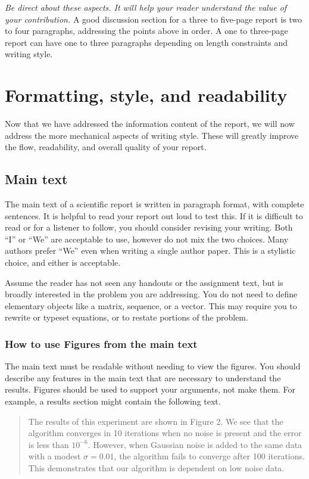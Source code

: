 \documentclass[]{article}
\begin{document}
\emph{Be direct about these aspects. It will help your reader understand the value of your contribution.}
A good discussion section for a three to five-page report is two to four paragraphs, addressing the points above in order. A one to three-page report can have one to three paragraphs depending on length constraints and writing style.

\section{Formatting, style, and readability}

Now that we have addressed the information content of the report, we will now address the more mechanical aspects of writing style. These will greatly improve the flow, readability, and overall quality of your report.

\subsection{Main text}
The main text of a scientific report is written in paragraph format, with complete sentences. It is helpful to read your report out loud to test this. If it is difficult to read or for a listener to follow, you should consider revising your writing. Both ``I'' or ``We'' are acceptable to use, however do not mix the two choices. Many authors prefer ``We'' even when writing a single author paper. This is a stylistic choice, and either is acceptable.


Assume the reader has not seen any handouts or the assignment text, but is broadly interested in the problem you are addressing. You do not need to define elementary objects like a matrix, sequence, or a vector.
This may require you to rewrite or typeset equations, or to restate portions of the problem.

\subsubsection{How to use Figures from the main text}
The main text must be readable without needing to view the figures. You should describe any features in the main text that are necessary to understand the results. Figures should be used to support your arguments, not make them. For example, a results section might contain the following text.
\begin{quote}
    The results of this experiment are shown in Figure 2. We see that the algorithm converges in 10 iterations when no noise is present and the error is less than $10^{-6}$. However, when Gaussian noise is added to the same data with a modest $\sigma=0.01$, the algorithm fails to converge after 100 iterations. This demonstrates that our algorithm is dependent on low noise data.
\end{quote}
\end{document}
